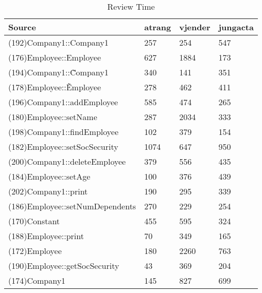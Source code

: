 \begin{table}[hb]
\begin{center}
\begin{tabular}{|l|l|l|l|}
\hline
Source & atrang & vjender & jungacta\\
\hline
(192)Company1::Company1 & 257 & 254 & 547\\
(176)Employee::Employee & 627 & 1884 & 173\\
(194)Company1::\~Company1 & 340 & 141 & 351\\
(178)Employee::\~Employee & 278 & 462 & 411\\
(196)Company1::addEmployee & 585 & 474 & 265\\
(180)Employee::setName & 287 & 2034 & 333\\
(198)Company1::findEmployee & 102 & 379 & 154\\
(182)Employee::setSocSecurity & 1074 & 647 & 950\\
(200)Company1::deleteEmployee & 379 & 556 & 435\\
(184)Employee::setAge & 100 & 376 & 439\\
(202)Company1::print & 190 & 295 & 339\\
(186)Employee::setNumDependents & 270 & 229 & 254\\
(170)Constant & 455 & 595 & 324\\
(188)Employee::print & 70 & 349 & 165\\
(172)Employee & 180 & 2260 & 763\\
(190)Employee::getSocSecurity & 43 & 369 & 204\\
(174)Company1 & 145 & 827 & 699\\
\hline
\end{tabular}
\end{center}
\caption{Review Time}
\end{table}


